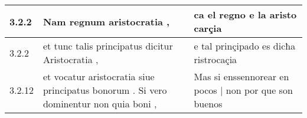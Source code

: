\begin{tabular}{|p{1cm}|p{6.5cm}|p{6.5cm}|}

\hline
3.2.2 & Nam regnum aristocratia , & ca el regno e la aristo carçia \\\hline
3.2.2 & et tunc talis principatus dicitur Aristocratia , & e tal prinçipado es dicħa ristrocaçia \\\hline
3.2.12 & et vocatur aristocratia siue principatus bonorum . Si vero dominentur non quia boni , & Mas si enssennorear en pocos | non por que son buenos \\\hline

\end{tabular}
